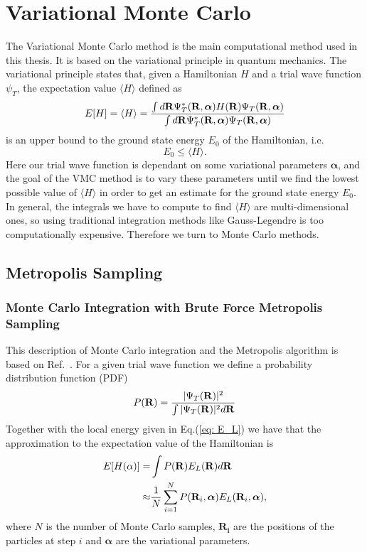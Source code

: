 \documentclass[../main.tex]{subfiles}
\begin{document}
\chapter{Variational Monte Carlo}\label{sec: VMC}

The Variational Monte Carlo method is the main computational method used in this thesis. It is based on the variational principle in quantum mechanics. The variational principle states that, given a Hamiltonian $H$ and a trial wave function $\psi_T$, the expectation value $\langle H \rangle$ defined as\cite{Griffiths}
\begin{equation}
 E[H] = \langle H \rangle =
 \frac{\int d {\bf R} \Psi_T^*({\bf R}, \boldsymbol{\alpha}) H({\bf R}) \Psi_T({\bf R}, \boldsymbol{\alpha})}
       {\int d {\bf R} \Psi_T^*({\bf R}, \boldsymbol{\alpha}) \Psi_T({\bf R}, \boldsymbol{\alpha})}
 \label{multidim}
\end{equation}
is an upper bound to the ground state energy $E_0$ of the Hamiltonian, i.e.
\begin{equation}
E_0 \leq \langle H \rangle.
\end{equation}
Here our trial wave function is dependant on some variational parameters $\boldsymbol{\alpha}$, and the goal of the VMC method is to vary these parameters until we find the lowest possible value of $\langle H\rangle$ in order to get an estimate for the ground state energy $E_0$. In general, the integrals we have to compute to find $\langle H\rangle$ are multi-dimensional ones, so using traditional integration methods like Gauss-Legendre is too computationally expensive. Therefore we turn to Monte Carlo methods.

\section{Metropolis Sampling}

\subsection{Monte Carlo Integration with Brute Force Metropolis Sampling}
This description of Monte Carlo integration and the Metropolis algorithm is based on Ref.~\cite{FYS4411-LectureNotes}.
For a given trial wave function we define a probability distribution function (PDF)
\begin{equation}
 P({\bf R}) = \frac{|\Psi_T({\bf R})|^2}{\int |\Psi_T({\bf R})|^2 d{\bf R}}
\end{equation}
Together with the local energy given in Eq.(\ref{eq: E_L}) we have that the approximation to the expectation value of the Hamiltonian is
\begin{align}
\begin{split}
E[H(\mathbf{\alpha})] =& \int P({\bf R}) E_L({\bf R}) d{\bf R}\\
\approx& \frac{1}{N} \sum_{i=1}^N P({\bf R}_i, \boldsymbol{\alpha}) E_L({\bf R}_i, \boldsymbol{\alpha}),
\end{split}
\end{align}
where $N$ is the number of Monte Carlo samples, $\mathbf{R_i}$ are the positions of the particles at step $i$ and $\boldsymbol{\alpha}$ are the variational parameters.
\end{document}
